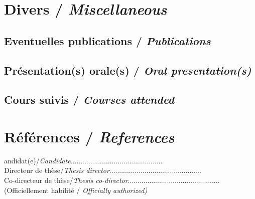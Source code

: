 \documentclass[11pt,titlepage]{article}
\begin{document}
\newpage
\section{Divers /  {\large\textit{Miscellaneous}}}

\subsection{Eventuelles publications / {\small \textit{Publications}}}
\subsection{Présentation(s) orale(s) / {\small \textit{Oral presentation(s)}}}
\subsection{Cours suivis / {\small \textit{Courses attended}}}


\newpage
\section{Références /  {\large\textit{References}}}


\begingroup
\renewcommand{\section}[2]{}%

\endgroup


\newpage
\section{Signatures}
Candidat(e)/\textit{Candidate}\hspace{8.3cm}...............................................\\

\noindent Directeur de thèse/\textit{Thesis director}\hspace{6.5cm}...............................................\\

\noindent Co-directeur de thèse/\textit{Thesis co-director}\hspace{5.5cm}...............................................\\
\noindent (Officiellement habilité / \textit{Officially authorized)}\\
\end{document}
